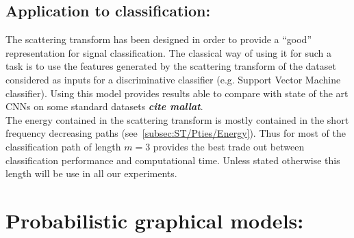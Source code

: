 \documentclass[a4paper,11pt]{report}
\begin{document}
{      
      
% 		
 
		
  \section{Application to classification:}
    \label{sec:ST/Applications to clf}
    
    The scattering transform has been designed in order to provide a ``good'' representation for signal classification. The classical way of using it for such a task is to use the features generated by the scattering transform of the dataset considered as inputs for a discriminative classifier (e.g. Support Vector Machine classifier). Using this model provides results able to compare with state of the art CNNs on some standard datasets \textbf{\textit{cite mallat}}. \\
    
    The energy contained in the scattering transform is mostly contained in the short frequency decreasing paths (see~\ref{subsec:ST/Pties/Energy}). Thus for most of the classification path of length $m=3$ provides the best trade out between classification performance and computational time. Unless stated otherwise this length will be use in all our experiments.
    
    
\chapter{Probabilistic graphical models:}
  \label{chap:PGMs}
  
}
\end{document}
